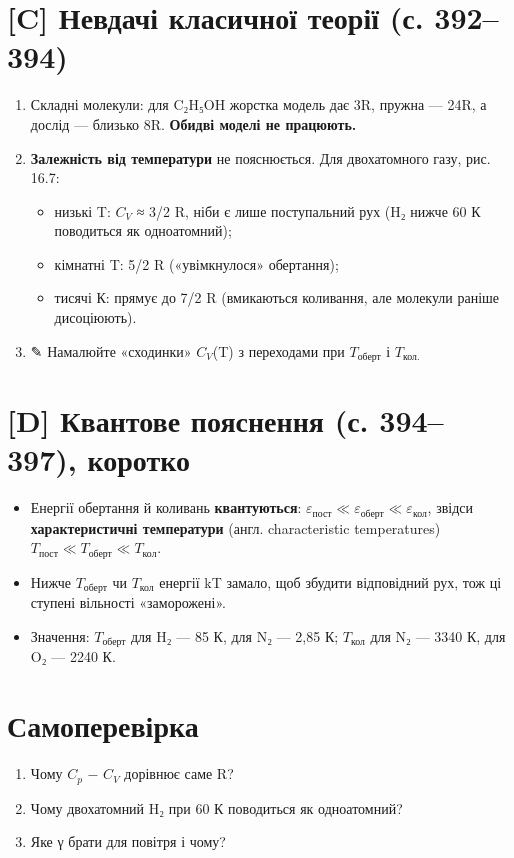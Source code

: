 \documentclass[11pt,a4paper,oneside]{book}
\newcommand{\pen}{{\sffamily\color{accent}✎}}
\begin{document}
\section*{[C] Невдачі класичної теорії (с. 392–394)}
\begin{enumerate}
\item Складні молекули: для C₂H₅OH жорстка модель дає 3R, пружна — 24R, а дослід — близько 8R. \textbf{Обидві моделі не працюють.}
\item \textbf{Залежність від температури} не пояснюється. Для двохатомного газу, рис. 16.7:
\begin{itemize}
\item низькі T: $C_{V}$ ≈ 3/2 R, ніби є лише поступальний рух (H₂ нижче 60 К поводиться як одноатомний);
\item кімнатні T: 5/2 R («увімкнулося» обертання);
\item тисячі К: прямує до 7/2 R (вмикаються коливання, але молекули раніше дисоціюють).
\end{itemize}
\item \pen{} Намалюйте «сходинки» $C_{V}$(T) з переходами при $T_{\text{оберт}}$ і $T_{\text{кол}.}$
\end{enumerate}

\section*{[D] Квантове пояснення (с. 394–397), коротко}
\begin{itemize}
\item Енергії обертання й коливань \textbf{квантуються}: $\varepsilon_{\text{пост}} \ll \varepsilon_{\text{оберт}} \ll \varepsilon_{\text{кол}}$, звідси \textbf{характеристичні температури} (англ. characteristic temperatures) $T_{\text{пост}} \ll T_{\text{оберт}} \ll T_{\text{кол}}$.
\item Нижче $T_{\text{оберт}}$ чи $T_{\text{кол}}$ енергії kT замало, щоб збудити відповідний рух, тож ці ступені вільності «заморожені».
\item Значення: $T_{\text{оберт}}$ для H₂ — 85 К, для N₂ — 2,85 К; $T_{\text{кол}}$ для N₂ — 3340 К, для O₂ — 2240 К.
\end{itemize}

\section*{Самоперевірка}
\begin{enumerate}
\item Чому $C_{p}$ − $C_{V}$ дорівнює саме R?
\item Чому двохатомний H₂ при 60 К поводиться як одноатомний?
\item Яке γ брати для повітря і чому?
\end{enumerate}
\end{document}
